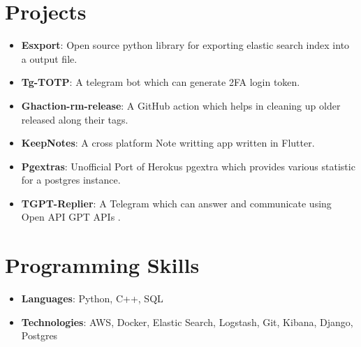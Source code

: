 \documentclass[letterpaper,11pt]{article}
\newcommand{\resumeItem}[2]{
  \item\small{
    \textbf{#1}{: #2 \vspace{-2pt}}
  }
}
\newcommand{\resumeSubItem}[2]{\resumeItem{#1}{#2}\vspace{-4pt}}
\newcommand{\resumeSubHeadingListStart}{\begin{itemize}[leftmargin=*]}
\newcommand{\resumeSubHeadingListEnd}{\end{itemize}}
\begin{document}
\section{Projects}
  \resumeSubHeadingListStart
    \resumeSubItem{Esxport}
      {Open source python library for exporting elastic search index into a output file.}
    \resumeSubItem{Tg-TOTP}
      {A telegram bot which can generate 2FA login token.}
    \resumeSubItem{Ghaction-rm-release}
      {A GitHub action which helps in cleaning up older released along their tags.}
    \resumeSubItem{KeepNotes}
      {A cross platform Note writting app written in Flutter.}
    \resumeSubItem{Pgextras}
      {Unofficial Port of Herokus pgextra which provides various statistic for a postgres instance.}
    \resumeSubItem{TGPT-Replier}
      {A Telegram which can answer and communicate using Open API GPT APIs .}
  \resumeSubHeadingListEnd

\section{Programming Skills}
 \resumeSubHeadingListStart
   \item{
     \textbf{Languages}{: Python, C++, SQL} \vspace{-5pt}
   }
   \item{
     \textbf{Technologies}{: AWS, Docker, Elastic Search, Logstash, Git, Kibana, Django, Postgres}
   }
 \resumeSubHeadingListEnd
  
\end{document}
